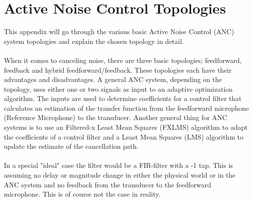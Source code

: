 \section{Active Noise Control Topologies} \label{sec:BasicSystem}
This appendix will go through the various basic Active Noise Control (ANC) system topologies and explain the chosen topology in detail. \\\\
When it comes to canceling noise, there are three basic topologies; feedforward, feedback and hybrid feedforward/feedback. These topologies each have their advantages and disadvantages.
A general ANC system, depending on the topology, uses either one or two signals as input to an adaptive optimization algorithm. The inputs are used to determine coefficients for a control filter that calculates an estimation of the transfer function from the feedforward microphone (Reference Microphone) to the transducer. Another general thing for ANC systems is to use an Filtered-x Least Mean Squares (FXLMS) algorithm to adapt the coefficients of a control filter and a Least Mean Squares (LMS) algorithm to update the estimate of the cancellation path.
\\\\
In a special "ideal" case the filter would be a FIR-filter with a -1 tap. This is assuming no delay or magnitude change in either the physical world or in the ANC system and no feedback from the transducer to the feedforward microphone. This is of course not the case in reality. 


